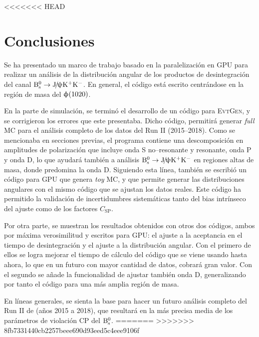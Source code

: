 













<<<<<<< HEAD
\section{Conclusiones}

Se ha presentado un marco de trabajo basado en la paralelización en GPU para realizar un análisis de la distribución angular de los productos de desintegración del canal $\text{B}{}_{\text{s}}^{0} \rightarrow \text{J}\!/\!\uppsi \text{K}{}^{+}\text{K}{}^{-}$. En general, el código está escrito centrándose en la región de masa del $\upphi(1020)$. 

En la parte de simulación, se terminó el desarrollo de un código para \textsc{EvtGen}, y se corrigieron los errores que este presentaba. Dicho código, permitirá generar \emph{full} MC para el análisis completo de los datos del Run II (2015--2018). Como se mencionaba en secciones previas, el programa contiene una descomposición en amplitudes de polarización que incluye onda S no--resonante y resonante, onda P y onda D, lo que ayudará también a análisis $\text{B}{}_{\text{s}}^{0} \rightarrow \text{J}\!/\!\uppsi \text{K}{}^{+}\text{K}{}^{-}$ en regiones altas de masa, donde predomina la onda D.
Siguiendo esta línea, también se escribió un código para GPU que genera \emph{toy} MC, y que permite generar las distribuciones angulares con el mismo código que se ajustan los datos reales. Este código ha permitido la validación de incertidumbres sistemáticas tanto del bias intrínseco del ajuste como de los factores $C_{\text{SP}}$.

Por otra parte, se muestran los resultados obtenidos con otros dos códigos, ambos por máxima verosimilitud y escritos para GPU: el ajuste a la aceptancia en el tiempo de desintegración y el ajuste a la distribución angular. Con el primero de ellos se logra mejorar el tiempo de cálculo del código que se viene usando hasta ahora, lo que en un futuro con mayor cantidad de datos, cobrará gran valor. Con el segundo se añade la funcionalidad de ajustar también onda D, generalizando por tanto el código para una más amplia región de masa.

 
En líneas generales, se sienta la base para hacer un futuro análisis completo del Run II de \lhcb (años 2015 a 2018), que resultará en la más precisa media de los parámetros de violación CP del $\text{B}{}_{\text{s}}^{0}$.
=======
>>>>>>> 8fb7331440cb2257beee690d93eed5c4eee9106f



